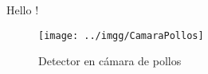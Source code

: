 \documentclass{article}
\begin{document}
  Hello !
  \begin{figure}[h!]
    \centering
        \texttt{[image: ../imgg/CamaraPollos]}
      \caption{Detector en cámara de pollos}
  \end{figure}
\end{document}
